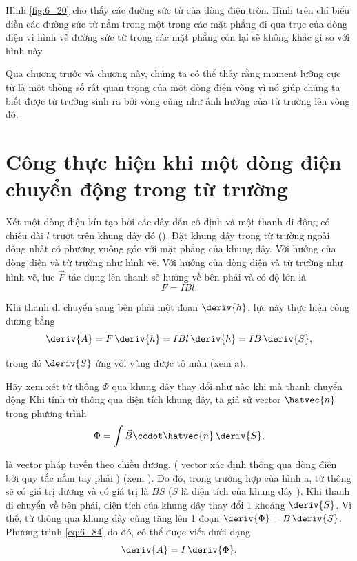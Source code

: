 Hình \ref{fig:6_20} cho thấy các đường sức từ của dòng điện tròn. Hình trên chỉ biểu diễn các đường sức từ nằm trong một trong các mặt phẳng đi qua trục của dòng điện vì hình vẽ đường sức từ trong các mặt phẳng còn lại sẽ không khác gì so với hình này.

Qua chương trước và chương này, chúng ta có thể thấy rằng moment lưỡng cực từ là một thông số rất quan trọng của một dòng điện vòng vì nó giúp chúng ta biết được từ trường sinh ra bởi vòng cũng như ảnh hưởng của từ trường lên vòng đó.

\section{Công thực hiện khi một dòng điện chuyển động trong từ trường}\label{6_10}

Xét một dòng điện kín tạo bởi các dây dẫn cố định và một thanh di động có chiều dài $l$ trượt trên khung dây đó (). Đặt khung dây trong từ trường ngoài đồng nhất có phương vuông góc với mặt phẳng của khung dây. Với hướng của dòng điện và từ trường như hình vẽ. Với hướng của dòng điện và từ trường như hình vẽ, lưc $\vec{F}$ tác dụng lên thanh sẽ hướng về bên phải và có độ lớn là
\begin{equation*}
    F = I B l.
\end{equation*}

\noindent
Khi thanh di chuyển sang bên phải một đoạn $\deriv{h}$, lực này thực hiện công dương bằng
\begin{equation}\label{eq:6_84}
    \deriv{A} = F\, \deriv{h} = I B l\, \deriv{h} = I B\, \deriv{S},
\end{equation}

\noindent
trong đó $\deriv{S}$ ứng với vùng được tô màu (xem a).

Hãy xem xét từ thông $\Phi$ qua khung dây thay đổi như nào khi mà thanh chuyển động Khi tính từ thông qua diện tích khung dây, ta giả sử vector $\hatvec{n}$ trong phương trình
\begin{equation*}
    \Phi = \int \vec{B} \ccdot \hatvec{n}\, \deriv{S},
\end{equation*}

\noindent
là vector pháp tuyến theo chiều dương, ( vector xác định thông qua dòng điện bởi quy tắc nắm tay phải ) (xem  ). Do đó, trong trường hợp của hình a, từ thông sẽ có giá trị dương và có giá trị là $BS$ ($S$ là diện tích của khung dây ). Khi thanh di chuyển về bên phải, diện tích của khung dây thay đổi 1 khoảng $\deriv{S}$. Vì thế, từ thông qua khung dây cũng tăng lên 1 đoạn $\deriv{\Phi}=B\,\deriv{S}$. Phương trình  \eqref{eq:6_84} do đó, có thể được viết dưới dạng
\begin{equation}\label{eq:6_85}
    \deriv{A} = I\, \deriv{\Phi}.
\end{equation}

